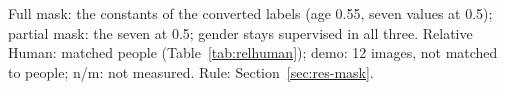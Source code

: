 \begin{table}[!tbp]
\smallskip
\parbox{\linewidth}{\scriptsize Full mask: the \MethodShapeMaskCount{} constants of the converted labels (age 0.55, seven
values at 0.5); partial mask: the seven at 0.5; gender stays supervised in all three. Relative Human: matched people
(Table~\ref{tab:relhuman}); demo: 12 images, not matched to people; n/m: not measured. Rule: Section~\ref{sec:res-mask}.}
\caption[The shape-mask arms]{The teacher without, with full and with partial shape mask on the AnnyOne holdout,
the 3DPW test set, Relative Human and the demo images. Both masked models fail the gender
threshold of the replacement rule.}
\label{tab:mask-arms}
\end{table}
